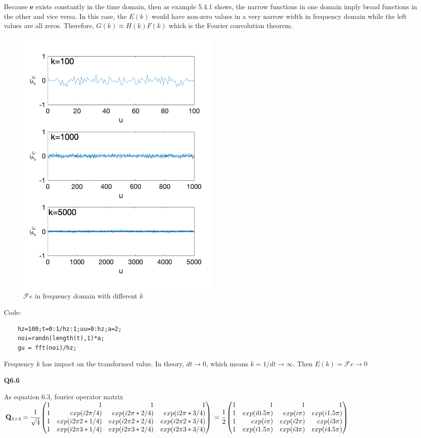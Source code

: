 \documentclass[12pt,a4paper]{article}
\begin{document}
    \noindent Because $\mathbf{e}$ exists constantly in the time domain, then as example 5.4.1 shows, the narrow functions in one domain imply broad functions in the other and vice versa. In this case, the $E(k)$ would have non-zero values in a very narrow width in frequency domain while the left values are all zeros. Therefore, $G(k)\approx H(k)F(k)$ which is the Fourier convolution theorem.

    \newpage
    \begin{figure}[!ht]
        \centering
        \includegraphics*[width=0.5\textwidth]{hw_6_5.png}
        \caption{$\mathcal{F}e$ in frequency domain with different $k$} 
    \end{figure}

    Code: \\
    \begin{lstlisting}
    hz=100;t=0:1/hz:1;uu=0:hz;a=2;
    noi=randn(length(t),1)*a;
    gu = fft(noi)/hz;
    \end{lstlisting}
    Frequency $k$ has impact on the transformed value. In theory, $dt \rightarrow 0$, which means $k=1/dt\rightarrow \infty$. Then $E(k)=\mathcal{F}e \rightarrow 0$

    \newpage 
    \Large{\textbf{Q6.6}}

    As equation 6.3, fourier operator matrix \\
    $\mathbf{Q}_{4\times 4}=\cfrac{1}{\sqrt{4}}\newvec{1&1&1&1\\1&exp(i2\pi/4)&exp(i2\pi*2/4)&exp(i2\pi*3/4)\\1&exp(i2\pi 2*1/4)&exp(i2\pi 2*2/4)&exp(i2\pi 2*3/4)\\1&exp(i2\pi 3*1/4)&exp(i2\pi 3*2/4)&exp(i2\pi 3*3/4)}\\
    =\cfrac{1}{2}\newvec{1&1&1&1\\1&exp(i0.5\pi)&exp(i\pi)&exp(i1.5\pi)\\1&exp(i\pi)&exp(i2\pi)&exp(i3\pi)\\1&exp(i1.5\pi)&exp(i3\pi)&exp(i4.5\pi)}$
\end{document}
